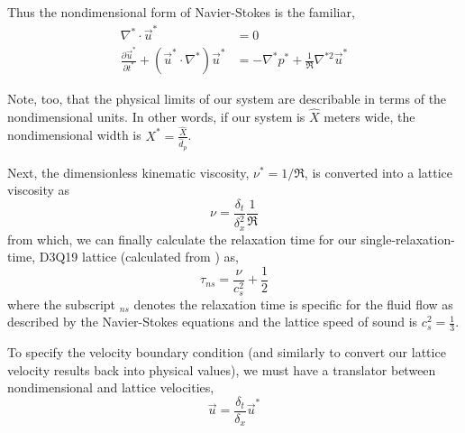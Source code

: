 Thus the nondimensional form of Navier-Stokes is the familiar,
\begin{subequations}\label{eq:non-dim-ns}
\begin{align}
	\nabla^* \cdot \vec{u}^* &= 0 \\
	\frac{\partial \vec{u}^*}{\partial t^*} + (\vec{u}^*\cdot\nabla^*)\vec{u}^* &= -\nabla^*p^* + \frac{1}{\Re}\nabla^{*2}\vec{u}^*
\end{align}
\end{subequations}

Note, too, that the physical limits of our system are describable in terms of the nondimensional units. In other words, if our system is $\hat{X}$ meters wide, the nondimensional width is $X^*=\frac{\hat{X}}{\hat{d}_p}$.  



Next, the dimensionless kinematic viscosity, $\nu^* = 1/\Re$, is converted into a lattice viscosity as
\begin{equation}\label{eq:fluid-nu}
	\nu = \frac{\delta_t}{\delta_x^2}\frac{1}{\Re}
\end{equation}
from which, we can finally calculate the relaxation time for our single-relaxation-time, D3Q19 lattice (calculated from ) as,
\begin{equation}
	\tau_{ns} = \frac{\nu}{c_s^2} + \frac{1}{2}
\end{equation}
where the subscript $_{ns}$ denotes the relaxation time is specific for the fluid flow as described by the Navier-Stokes equations and the lattice speed of sound is $c_s^2 = \frac{1}{3}$.

To specify the velocity boundary condition (and similarly to convert our lattice velocity results back into physical values), we must have a translator between nondimensional and lattice velocities,
\begin{equation}\label{eq:lbm-u}
	\vec{u} = \frac{\delta_t}{\delta_x}\vec{u}^*
\end{equation}

